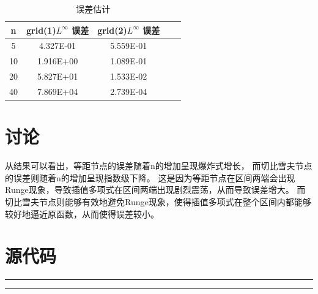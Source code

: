 \documentclass{article}
\begin{document}
\begin{table}[htb]
\caption{\label{table.label} 误差估计} \centering
\bigskip
\begin{small}
\begin{tabular}{|c|cc|cc|}
  \hline
  n & grid(1)$ L^\infty$ 误差 & grid(2)$ L^\infty$ 误差 \\\hline
5 &   4.327E-01  &  5.559E-01\\
10&   1.916E+00  &  1.089E-01\\
20&   5.827E+01  &  1.533E-02\\
40&   7.869E+04  &  2.739E-04\\\hline
\end{tabular}
\end{small}
\end{table}
\section{讨论}

从结果可以看出，等距节点的误差随着n的增加呈现爆炸式增长，
而切比雪夫节点的误差则随着n的增加呈现指数级下降。
这是因为等距节点在区间两端会出现Runge现象，导致插值多项式在区间两端出现剧烈震荡，从而导致误差增大。
而切比雪夫节点则能够有效地避免Runge现象，使得插值多项式在整个区间内都能够较好地逼近原函数，从而使得误差较小。

\appendix
\section{源代码}


\small \hrule  \hrule
\end{document}

